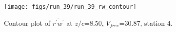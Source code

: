 \begin{figure}[H]
\centering
\texttt{[image: figs/run\_39/run\_39\_rw\_contour]}
\caption{Contour plot of $\overline{r^\prime w^\prime}$ at $z/c$=8.50, $V_{free}$=30.87, station 4.}
\label{fig:run_39_rw_contour}
\end{figure}


